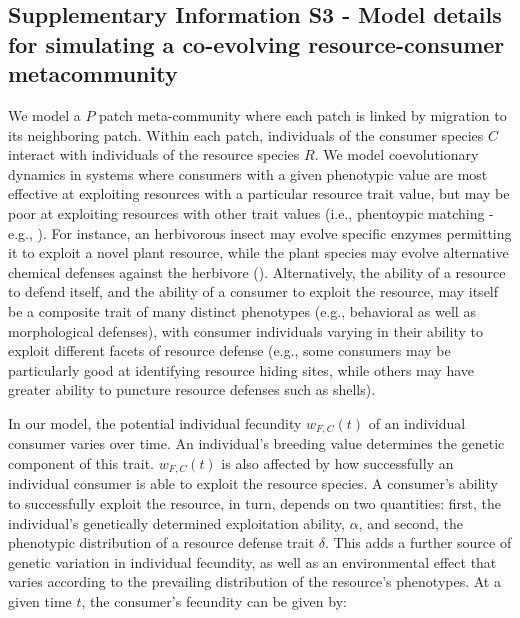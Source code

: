 \documentclass[11pt]{article}
\begin{document}
\begin{linenumbers}
\renewcommand\linenumberfont{\normalfont\small}
\setlength\linenumbersep{1cm}

\renewcommand{\theequation}{S3-\arabic{equation}}
 
\setcounter{equation}{0}  %
\section*{Supplementary Information S3 - Model details for simulating a co-evolving resource-consumer metacommunity}
We model a $P$ patch meta-community where each patch is linked by migration to its neighboring patch. Within each patch, individuals of  the consumer species $C$ interact with individuals of the resource species $R$. We model coevolutionary dynamics in systems where consumers with a given phenotypic value are most effective at exploiting resources with a particular resource trait value, but may be poor at exploiting resources with other trait values (i.e., phentoypic matching - e.g., \citealt{nuismer07}). For instance, an herbivorous insect may evolve specific enzymes permitting it to exploit a novel plant resource, while the plant species may evolve alternative chemical defenses against the herbivore (\citealt{rasmann11a}). Alternatively, the ability of a resource to defend itself, and the ability of a consumer to exploit the resource, may itself be a composite trait of many distinct phenotypes (e.g., behavioral as well as morphological defenses), with consumer individuals varying in their ability to exploit different facets of resource defense (e.g., some consumers may be particularly good at identifying resource hiding sites, while others may have greater ability to puncture resource defenses such as shells).

In our model, the potential individual fecundity $w_{F,C}(t)$ of an individual consumer varies over time. An individual's breeding value determines the genetic component of this trait. $w_{F,C}(t)$ is also affected by how successfully an individual consumer is able to exploit the resource species. A consumer's ability to successfully exploit the resource, in turn, depends on two quantities: first, the individual's genetically determined exploitation ability, $\alpha$, and second, the phenotypic distribution of a resource defense trait $\delta$.  This adds a further source of genetic variation in individual fecundity, as well as an environmental effect that varies according to the prevailing distribution of the resource's phenotypes. At a given time $t$, the consumer's fecundity can be given by:


\end{linenumbers}
\end{document}
